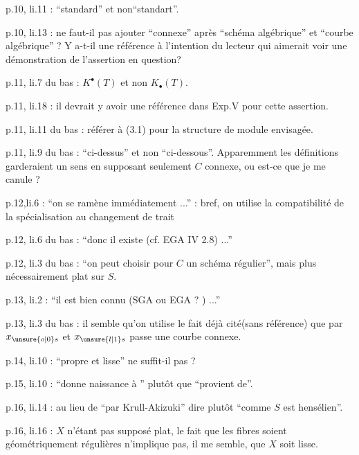p.10, li.11 : ``standard'' et non``standart''.

p.10, li.13 : ne faut-il pas ajouter ``connexe'' après ``schéma algébrique'' et ``courbe algébrique'' ? Y a-t-il une référence à l'intention du lecteur qui aimerait voir une démonstration de l'assertion en question?

\clearpage
{}

p.11, li.7 du bas : $K^{\bullet}(T)$ et non $K_{\bullet}(T)$.

p.11, li.18 : il devrait y avoir une référence dans Exp.V pour cette assertion.

p.11, li.11 du bas : référer à (3.1) pour la structure de module envisagée.

p.11, li.9 du bas : ``ci-dessus'' et non ``ci-dessous''. Apparemment les définitions garderaient un sens en supposant seulement $C$ connexe, ou est-ce que je me canule ?

p.12,li.6 : ``on se ramène immédiatement ...'' : bref, on utilise la compatibilité de la spécialisation au changement de trait

p.12, li.6 du bas : ``donc il existe (cf. EGA IV 2.8) ...''

p.12, li.3 du bas : ``on peut choisir pour $C$ un schéma régulier'', mais plus nécessairement plat sur $S$.

p.13, li.2 : ``il est bien connu (SGA ou EGA ? ) ...''


p.13, li.3 du bas : il semble qu'on utilise le fait déjà cité(sans référence) que par $x_{\unsure{o|0}s}$ et $x_{\unsure{l|1}s}$ passe une courbe connexe.

p.14, li.10 : ``propre et lisse'' ne suffit-il pas ?

p.15, li.10 : ``donne naissance à '' plutôt que ``provient de''.

p.16, li.14 : au lieu de ``par Krull-Akizuki'' dire plutôt ``comme $S$ est hensélien''.

p.16, li.16 : $X$ n'étant pas supposé plat, le fait que les fibres soient géométriquement régulières n'implique pas, il me semble, que $X$ soit lisse.


